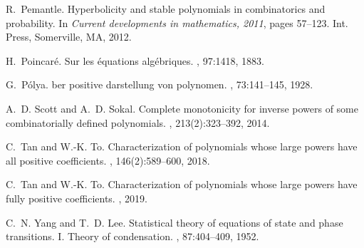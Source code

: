 \documentclass{daj}
\theoremstyle{definition}
\theoremstyle{remark}
\begin{document}
\begin{thebibliography}{10}
R.~Pemantle.
\newblock Hyperbolicity and stable polynomials in combinatorics and
  probability.
\newblock In {\em Current developments in mathematics, 2011}, pages 57--123.
  Int. Press, Somerville, MA, 2012.

H.~Poincar\'e.
\newblock Sur les \'equations alg\'ebriques.
, 97:1418, 1883.

G.~P{\'o}lya.
ber positive darstellung von polynomen.
, 73:141--145, 1928.

A.~D. Scott and A.~D. Sokal.
\newblock Complete monotonicity for inverse powers of some combinatorially
  defined polynomials.
, 213(2):323--392, 2014.

C.~Tan and W.-K. To.
\newblock Characterization of polynomials whose large powers have all positive
  coefficients.
, 146(2):589--600, 2018.

C.~Tan and W.-K. To.
\newblock Characterization of polynomials whose large powers have fully
  positive coefficients.
, 2019.

C.~N. Yang and T.~D. Lee.
\newblock Statistical theory of equations of state and phase transitions. {I}.
  {T}heory of condensation.
, 87:404--409, 1952.

\end{thebibliography}
\end{document}
